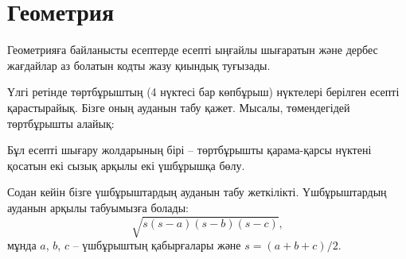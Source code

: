\chapter{Геометрия}


Геометрияға байланысты есептерде
есепті ыңғайлы шығаратын және
дербес жағдайлар аз болатын кодты жазу қиындық туғызады.


Үлгі ретінде төртбұрыштың (4 нүктесі бар көпбұрыш) 
нүктелері берілген есепті қарастырайық. Бізге оның
ауданын табу қажет. Мысалы, төмендегідей төртбұрышты 
алайық:


\begin{center}
\end{center}
Бұл есепті шығару жолдарының бірі -- төртбұрышты қарама-қарсы нүктені қосатын екі сызық арқылы екі үшбұрышқа бөлу. 
\begin{center}
\end{center}
Содан кейін бізге үшбұрыштардың ауданын табу
жеткілікті. Үшбұрыштардың ауданын 
арқылы табуымызға болады:
\[ \sqrt{s (s-a) (s-b) (s-c)},\]
мұнда $a$, $b$, $c$ -- үшбұрыштың қабырғалары және
$s=(a+b+c)/2$.

